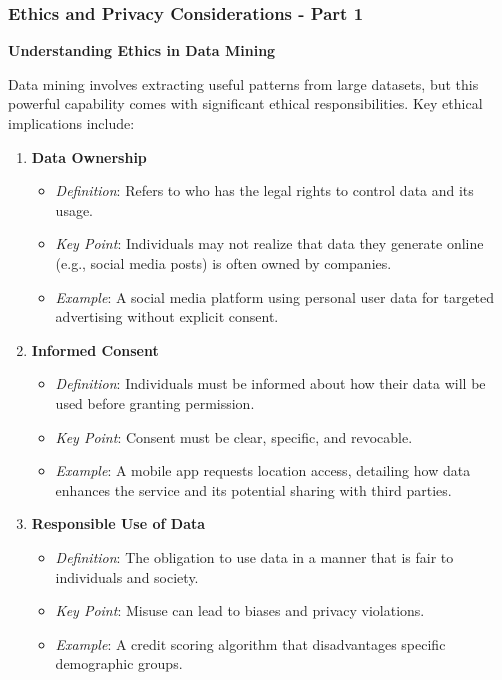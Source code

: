 \documentclass{beamer}
\begin{document}
\begin{frame}[fragile]
    \frametitle{Ethics and Privacy Considerations - Part 1}
    
    \textbf{Understanding Ethics in Data Mining}

    Data mining involves extracting useful patterns from large datasets, but this powerful capability comes with significant ethical responsibilities. Key ethical implications include:

    \begin{enumerate}
        \item \textbf{Data Ownership}
        \begin{itemize}
            \item \textit{Definition}: Refers to who has the legal rights to control data and its usage.
            \item \textit{Key Point}: Individuals may not realize that data they generate online (e.g., social media posts) is often owned by companies.
            \item \textit{Example}: A social media platform using personal user data for targeted advertising without explicit consent.
        \end{itemize}

        \item \textbf{Informed Consent}
        \begin{itemize}
            \item \textit{Definition}: Individuals must be informed about how their data will be used before granting permission.
            \item \textit{Key Point}: Consent must be clear, specific, and revocable.
            \item \textit{Example}: A mobile app requests location access, detailing how data enhances the service and its potential sharing with third parties.
        \end{itemize}

        \item \textbf{Responsible Use of Data}
        \begin{itemize}
            \item \textit{Definition}: The obligation to use data in a manner that is fair to individuals and society.
            \item \textit{Key Point}: Misuse can lead to biases and privacy violations.
            \item \textit{Example}: A credit scoring algorithm that disadvantages specific demographic groups.
        \end{itemize}
    \end{enumerate}
\end{frame}
\end{document}
